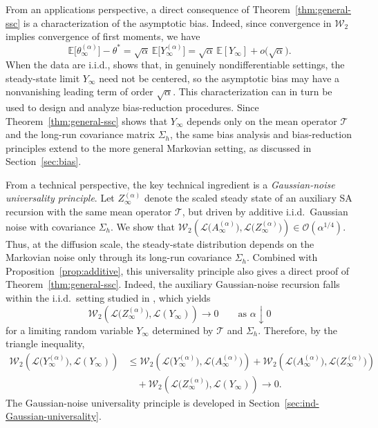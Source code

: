\documentclass[11pt,letterpaper]{article}
\theoremstyle{plain}
\theoremstyle{definition}
\theoremstyle{remark}
\newcommand{\E}{\mathbb{E}}
\newcommand{\mT}{\mathcal{T}}
\newcommand{\W}{\mathcal{W}}
\newcommand{\law}{\mathcal{L}}
\begin{document}
From an applications perspective, a direct consequence of
Theorem~\ref{thm:general-ssc} is a  characterization of the
asymptotic bias. Indeed, since convergence in
\(\W_2\) implies convergence of first moments, we have
\begin{equation}\label{eq:general-bias}
\E\bigl[\theta_\infty^{(\alpha)}\bigr]-\theta^*
    =
    \sqrt{\alpha}\,
    \E\bigl[Y_\infty^{(\alpha)}\bigr]
    =
    \sqrt{\alpha}\,\E[Y_\infty]
    +
    o\bigl(\sqrt{\alpha}\bigr).
\end{equation}
When the data are i.i.d., \cite{zhang2024prelimit} shows that, in genuinely
nondifferentiable settings, the steady-state limit \(Y_\infty\) need not be
centered, so the asymptotic bias may have a nonvanishing leading term of
order \(\sqrt{\alpha}\). This characterization can in turn be used to design
and analyze bias-reduction procedures. Since
Theorem~\ref{thm:general-ssc} shows that \(Y_\infty\) depends only on the mean
operator \(\mT\) and the long-run covariance matrix \(\Sigma_h\), the same
bias analysis and bias-reduction principles extend to the more general
Markovian setting, as discussed in Section~\ref{sec:bias}.

From a technical perspective, the key technical ingredient is a \emph{Gaussian-noise universality principle}. Let \(Z_\infty^{(\alpha)}\) denote the scaled steady state of an auxiliary SA recursion with the same mean operator \(\mT\), but driven by additive i.i.d.\ Gaussian noise with covariance \(\Sigma_h\). We show that $\W_2\left(
        \law\bigl(A_\infty^{(\alpha)}\bigr),
        \law\bigl(Z_\infty^{(\alpha)}\bigr)
    \right)
    \in
    \mathcal{O}\left(
       \alpha^{1/4}
    \right).$ Thus, at the diffusion scale, the steady-state distribution depends on the Markovian noise only through its long-run covariance \(\Sigma_h\). Combined with Proposition~\ref{prop:additive}, this universality principle also gives a direct proof of Theorem~\ref{thm:general-ssc}. Indeed, the auxiliary Gaussian-noise recursion falls within the i.i.d.\ setting studied in \cite{zhang2024prelimit}, which yields \[ \W_2\left( \law\bigl(Z_\infty^{(\alpha)}\bigr), \law(Y_\infty) \right) \longrightarrow 0 \qquad\text{as }\alpha\downarrow0 \] for a limiting random variable \(Y_\infty\) determined by \(\mT\) and \(\Sigma_h\). Therefore, by the triangle inequality, \[ \begin{aligned} \W_2\left( \law\bigl(Y_\infty^{(\alpha)}\bigr), \law(Y_\infty) \right) &\leq \W_2\left( \law\bigl(Y_\infty^{(\alpha)}\bigr), \law\bigl(A_\infty^{(\alpha)}\bigr) \right) + \W_2\left( \law\bigl(A_\infty^{(\alpha)}\bigr), \law\bigl(Z_\infty^{(\alpha)}\bigr) \right) \\ &\quad+ \W_2\left( \law\bigl(Z_\infty^{(\alpha)}\bigr), \law(Y_\infty) \right) \longrightarrow 0. \end{aligned} \] The Gaussian-noise universality principle is developed in Section~\ref{sec:ind-Gaussian-universality}.
\end{document}
